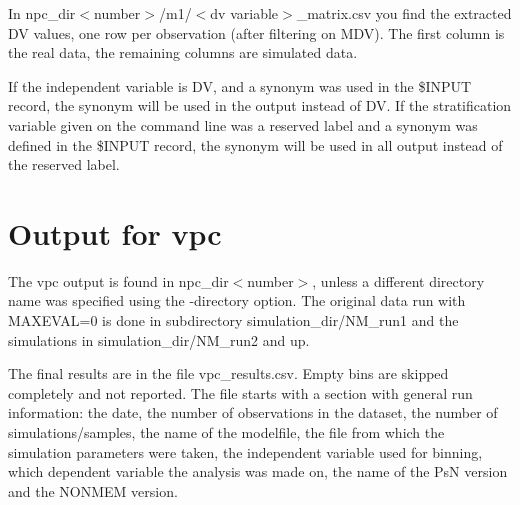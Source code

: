 In npc\_dir$<$number$>$/m1/$<$dv variable$>$\_matrix.csv you find the extracted DV values, one row per observation (after filtering on MDV). The first column is the real data, the remaining columns are simulated data.

If the independent variable is DV, and a synonym was used in the \$INPUT record, the synonym will be used in the output instead of DV.  If  the stratification variable given on the command line was a reserved label and a synonym was defined in the \$INPUT record, the synonym will be used in all output instead of the reserved label.

\section{Output for vpc}
The vpc output is found in npc\_dir$<$number$>$, unless a different directory name was specified using the -directory option. The original data run with MAXEVAL=0 is done in subdirectory simulation\_dir/NM\_run1 and the simulations in simulation\_dir/NM\_run2 and up. 

The final results are in the file vpc\_results.csv. Empty bins are skipped completely and not reported. The file starts with a section with general run information: the date, the number of observations in the dataset, the number of simulations/samples, the name of the modelfile, the file from which the simulation parameters were taken, the independent variable used for binning, which dependent variable the analysis was made on, the name of the PsN version and the NONMEM version. 

